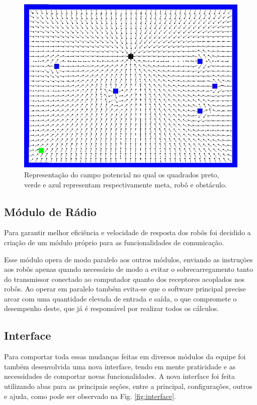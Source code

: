 \begin{figure}[!htb]
    \centering
        \includegraphics[scale=0.3]{imagens/simulador_CP.png}
        \caption{Representação do campo potencial no qual os quadrados preto, verde e azul representam respectivamente meta, robô e obstáculo.}
    \label{f.CP}
\end{figure}

\subsection{Módulo de Rádio}

Para garantir melhor eficiência e velocidade de resposta dos robôs foi decidido a criação de um módulo próprio para as funcionalidades de comunicação.

Esse módulo opera de modo paralelo aos outros módulos, enviando as instruções aos robôs apenas quando necessário de modo a evitar o sobrecarregamento tanto do transmissor conectado ao computador quanto dos receptores acoplados nos robôs. Ao operar em paralelo também evita-se que o software principal precise arcar com uma quantidade elevada de entrada e saída, o que compromete o desempenho deste, que já é responsável por realizar todos os cálculos.

\subsection{Interface}

Para comportar toda essas mudanças feitas em diversos módulos da equipe foi também desenvolvida uma nova interface, tendo em mente praticidade e as necessidades de comportar novas funcionalidades. A nova interface foi feita utilizando abas para as principais seções, entre a principal, configurações, outros e ajuda, como pode ser observado na Fig. \ref{fig:interface}.

